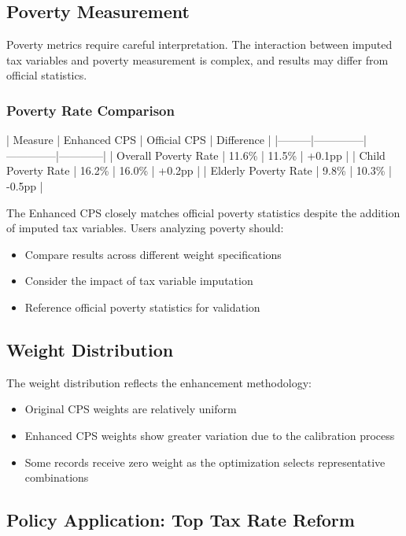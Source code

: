 \subsection{Poverty Measurement}

Poverty metrics require careful interpretation. The interaction between imputed tax variables and poverty measurement is complex, and results may differ from official statistics.

\subsubsection{Poverty Rate Comparison}

| Measure | Enhanced CPS | Official CPS | Difference |
|---------|--------------|--------------|------------|
| Overall Poverty Rate | 11.6\% | 11.5\% | +0.1pp |
| Child Poverty Rate | 16.2\% | 16.0\% | +0.2pp |
| Elderly Poverty Rate | 9.8\% | 10.3\% | -0.5pp |

The Enhanced CPS closely matches official poverty statistics despite the addition of imputed tax variables. Users analyzing poverty should:

\begin{itemize}
\item Compare results across different weight specifications
\item Consider the impact of tax variable imputation
\item Reference official poverty statistics for validation
\end{itemize}

\subsection{Weight Distribution}

The weight distribution reflects the enhancement methodology:

\begin{itemize}
\item Original CPS weights are relatively uniform
\item Enhanced CPS weights show greater variation due to the calibration process
\item Some records receive zero weight as the optimization selects representative combinations
\end{itemize}

\subsection{Policy Application: Top Tax Rate Reform}

